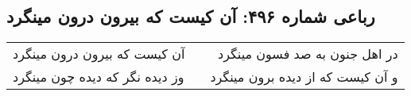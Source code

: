 \begin{center}
\section*{رباعی شماره ۴۹۶: آن کیست که بیرون درون مینگرد}
\label{sec:0496}
\begin{longtable}{l p{0.5cm} r}
آن کیست که بیرون درون مینگرد
&&
در اهل جنون به صد فسون مینگرد
\\
وز دیده نگر که دیده چون مینگرد
&&
و آن کیست که از دیده برون مینگرد
\\
\end{longtable}
\end{center}
